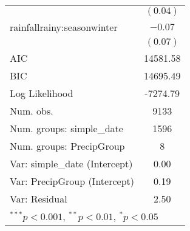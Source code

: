 \begin{table}
\begin{center}
\begin{tabular}{l c }
                                  & $(0.04)$      \\
rainfallrainy:seasonwinter        & $-0.07$       \\
                                  & $(0.07)$      \\
\hline
AIC                               & 14581.58      \\
BIC                               & 14695.49      \\
Log Likelihood                    & -7274.79      \\
Num. obs.                         & 9133          \\
Num. groups: simple\_date          & 1596          \\
Num. groups: PrecipGroup          & 8             \\
Var: simple\_date (Intercept)      & 0.00          \\
Var: PrecipGroup (Intercept)      & 0.19          \\
Var: Residual                     & 2.50          \\
\hline
\multicolumn{2}{l}{\scriptsize{$^{***}p<0.001$, $^{**}p<0.01$, $^*p<0.05$}}
\end{tabular}
\label{table:soil_moisture_model}
\end{center}
\end{table}
